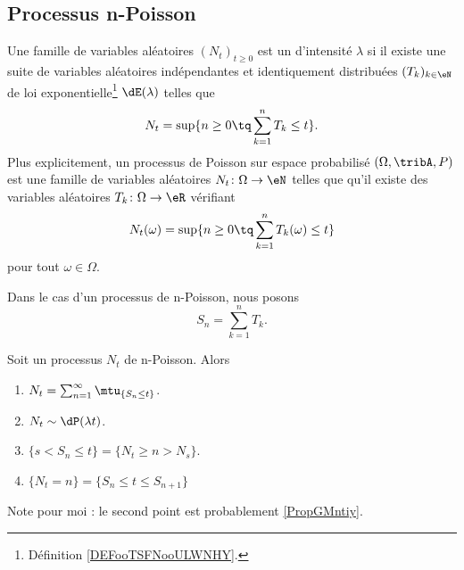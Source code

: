 \subsection{Processus n-Poisson}

\begin{definition}      \label{DEFooWXHEooEHQUJU}
	Une famille de variables aléatoires \( (N_t)_{t\geq 0}\) est un  d'intensité \( \lambda\) si il existe une suite de variables aléatoires indépendantes et identiquement distribuées \( (T_k)_{k\in \eN}\) de loi exponentielle\footnote{Définition \ref{DEFooTSFNooULWNHY}.} \( \dE(\lambda)\) telles que
	\begin{equation}
		N_t=\sup\{ n\geq 0\tq \sum_{k=1}^nT_k\leq t \}.
	\end{equation}
	Plus explicitement, un processus de Poisson sur espace probabilisé \( (\Omega,\tribA,P)\) est une famille de variables aléatoires \( N_t\colon \Omega\to \eN\) telles que qu'il existe des variables aléatoires \( T_k\colon \Omega\to \eR\) vérifiant
	\begin{equation}
		N_t(\omega)=\sup\{ n\geq 0\tq \sum_{k=1}^nT_k(\omega)\leq t \}
	\end{equation}
	pour tout \( \omega\in\Omega\).

	Dans le cas d'un processus de n-Poisson, nous posons
	\begin{equation}
		S_n=\sum_{k=1}^nT_k.
	\end{equation}
\end{definition}

\begin{lemma}	\label{LEMooZTPGooYsFfNX}
	Soit un processus \( N_t\) de n-Poisson. Alors
	\begin{enumerate}

		\item
		      \( N_t=\sum_{n=1}^{\infty}\mtu_{\{ S_n\leq t \}}\).
		\item
		      \( N_t\sim\dP(\lambda t)\).
		\item
		      \( \{ s<S_n\leq t \}=\{ N_t\geq n>N_s \}\).
		\item
		      \( \{ N_t=n \}=\{ S_n\leq t\leq S_{n+1} \}\)
	\end{enumerate}
	Note pour moi : le second point est probablement \ref{PropGMntiy}.
\end{lemma}

